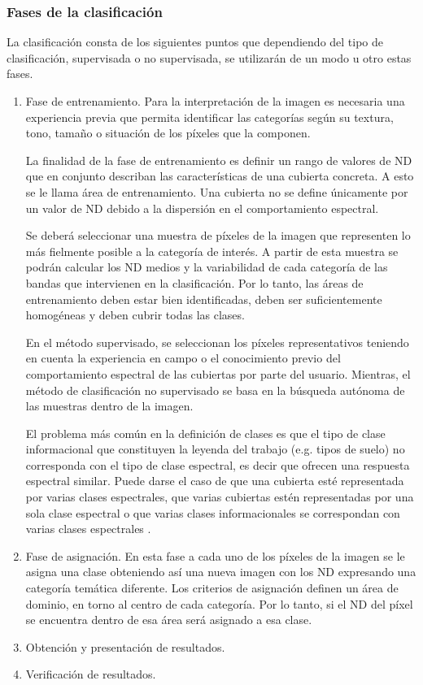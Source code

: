 \subsubsection{Fases de la clasificación}
La clasificación consta de los siguientes puntos que dependiendo del tipo de clasificación, supervisada o no supervisada, se utilizarán de un modo u otro estas fases.
\begin{enumerate}
	\item Fase de entrenamiento.
Para la interpretación de la imagen es necesaria una experiencia previa que permita identificar las categorías según su textura, tono, tamaño o situación de los píxeles que la componen.

La finalidad de la fase de entrenamiento es definir un rango de valores de \ac{ND} que en conjunto describan las características de una cubierta concreta. A esto se le llama área de entrenamiento. Una cubierta no se define únicamente por un valor de \ac{ND} debido a la dispersión en el comportamiento espectral.

Se deberá seleccionar una muestra de píxeles de la imagen que representen lo más fielmente posible a la categoría de interés. A partir de esta muestra se podrán calcular los \ac{ND} medios y la variabilidad de cada categoría de las bandas que intervienen en la clasificación. Por lo tanto, las áreas de entrenamiento deben estar bien identificadas, deben ser suficientemente homogéneas y deben cubrir todas las clases.

En el método supervisado, se seleccionan los píxeles representativos teniendo en cuenta la experiencia en campo o el conocimiento previo del comportamiento espectral de las cubiertas por parte del usuario. Mientras, el método de clasificación no supervisado se basa en la búsqueda autónoma de las muestras dentro de la imagen.

El problema más común en la definición de clases es que el tipo de clase informacional que constituyen la leyenda del trabajo (e.g. tipos de suelo) no corresponda con el tipo de clase espectral, es decir que ofrecen una respuesta espectral similar. Puede darse el caso de que una cubierta esté representada por varias clases espectrales, que varias cubiertas estén representadas por una sola clase espectral o que varias clases informacionales se correspondan con varias clases espectrales \citep{chuvieco2002teledeteccion}.

	\item Fase de asignación.
En esta fase a cada uno de los píxeles de la imagen se le asigna una clase obteniendo así una nueva imagen con los \ac{ND} expresando una categoría temática diferente. Los criterios de asignación definen un área de dominio, en torno al centro de cada categoría. Por lo tanto, si el \ac{ND} del píxel se encuentra dentro de esa área será asignado a esa clase.

	\item Obtención y presentación de resultados.
	\item Verificación de resultados.
\end{enumerate}

